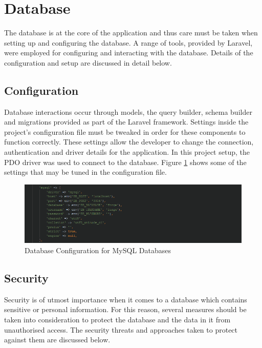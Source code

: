 \section{Database}
The database is at the core of the application and thus care must be taken when setting up and configuring the database. A range of tools, provided by Laravel, were employed for configuring and interacting with the database. Details of the configuration and setup are discussed in detail below.

\subsection{Configuration}
Database interactions occur through models, the query builder, schema builder and migrations provided as part of the Laravel framework. Settings inside the project's configuration file must be tweaked in order for these components to function correctly. These settings allow the developer to change the connection, authentication and driver details for the application. In this project setup, the PDO driver was used to connect to the database. Figure \ref{fig:DatabaseConfig} shows some of the settings that may be tuned in the configuration file.

\begin{figure}[H]
    \centering
    \includegraphics[width=\textwidth]{Images/Implementation/MySQLConfig}
    \caption{Database Configuration for MySQL Databases} \label{fig:DatabaseConfig}
\end{figure}


\subsection{Security}
Security is of utmost importance when it comes to a database which contains sensitive or personal information. For this reason, several measures should be taken into consideration to protect the database and the data in it from unauthorised access. The security threats and approaches taken to protect against them are discussed below.


